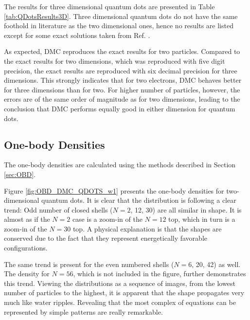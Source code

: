 The results for three dimensional quantum dots are presented in Table \ref{tab:QDotsResults3D}. Three dimensional quantum dots do not have the same foothold in literature as the two dimensional ones, hence no results are listed except for some exact solutions taken from Ref. \cite{taut}. 

As expected, DMC reproduces the exact results for two particles. Compared to the exact results for two dimensions, which was reproduced with five digit precision, the exact results are reproduced with six decimal precision for three dimensions. This strongly indicates that for two electrons, DMC behaves better for three dimensions than for two. For higher number of particles, however, the errors are of the same order of magnitude as for two dimensions, leading to the conclusion that DMC performs equally good in either dimension for quantum dots. 

\subsection{One-body Densities}

The one-body densities are calculated using the methods described in Section \ref{sec:OBD}.

Figure \ref{fig:OBD_DMC_QDOTS_w1} presents the one-body densities for two-dimensional quantum dots. It is clear that the distribution is following a clear trend: Odd number of closed shells ($N=2$, 12, 30) are all similar in shape. It is almost as if the $N=2$ case is a zoom-in of the $N=12$ top, which in turn is a zoom-in of the $N=30$ top. A physical explanation is that the shapes are conserved due to the fact that they represent energetically favorable configurations. 

The same trend is present for the even numbered shells ($N=6$, 20, 42) as well. The density for $N=56$, which is not included in the figure, further demonstrates this trend. Viewing the distributions as a sequence of images, from the lowest number of particles to the highest, it is apparent that the shape propagates very much like water ripples. Revealing that the most complex of equations can be represented by simple patterns are really remarkable.


